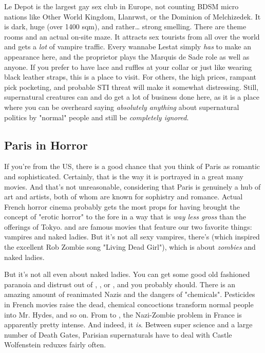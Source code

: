 Le Depot is the largest gay sex club in Europe, not counting BDSM micro nations like Other World Kingdom, Llanrwst, or the Dominion of Melchizedek. It is dark, huge (over 1400 sqm), and rather\ldots{} strong smelling. There are theme rooms and an actual on-site maze. It attracts sex tourists from all over the world and gets a \textit{lot} of vampire traffic. Every wannabe Lestat simply \textit{has} to make an appearance here, and the proprietor plays the Marquis de Sade role as well as anyone. If you prefer to have lace and ruffles at your collar or just like wearing black leather straps, this is a place to visit. For others, the high prices, rampant pick pocketing, and probable STI threat will make it somewhat distressing. Still, supernatural creatures can and do get a lot of business done here, as it is a place where you can be overheard saying \textit{absolutely anything} about supernatural politics by "normal" people and still be \textit{completely ignored}.

\subsection{Paris in Horror}

\hspace{\parindent} If you're from the US, there is a good chance that you think of Paris as romantic and sophisticated. Certainly, that is the way it is portrayed in a great many movies. And that's not unreasonable, considering that Paris is genuinely a hub of art and artists, both of whom are known for sophistry and romance. Actual French horror cinema probably gets the most props for having brought the concept of "erotic horror" to the fore in a way that is \textit{way less gross} than the offerings of Tokyo.  and  are famous movies that feature our two favorite things: vampires and naked ladies. But it's not all sexy vampires, there's  (which inspired the excellent Rob Zombie song "Living Dead Girl"), which is about \textit{zombies} and naked ladies.

But it's not all even about naked ladies. You can get some good old fashioned paranoia and distrust out of , , or , and you probably should. There is an amazing amount of reanimated Nazis and the dangers of "chemicals". Pesticides in French movies raise the dead, chemical concoctions transform normal people into Mr. Hydes, and so on. From  to , the Nazi-Zombie problem in France is apparently pretty intense. And indeed, it \textit{is}. Between super science and a large number of Death Gates, Parisian supernaturals have to deal with Castle Wolfenstein reduxes fairly often.

